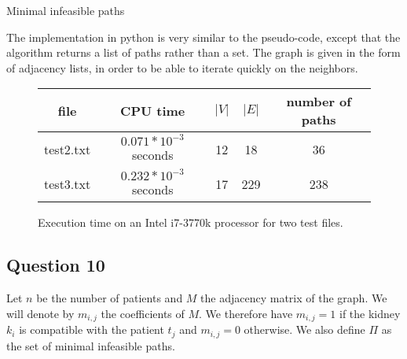 \documentclass[english]{article}
\begin{document}
\begin{algorithm}

    \caption{Minimal infeasible paths}
    


    
  \end{algorithm}

The implementation in python is very similar to the pseudo-code, except that the algorithm returns a list of paths rather than a set. The graph is given in the form of adjacency lists, in order to be able to iterate quickly on the neighbors.

\begin{figure}[ht]
    \centering
    \begin{tabular}{|c|c|c|c|c|}
        \hline
        file & CPU time & $|V|$ & $|E|$ & number of paths \\
        \hline
        test2.txt & $0.071 * 10^{-3}$ seconds & 12 & 18 & 36 \\
        test3.txt & $0.232 * 10^{-3}$ seconds & 17 & 229 & 238 \\
        \hline
    \end{tabular}
    \caption{Execution time on an Intel i7-3770k processor for two test files.}
\end{figure}

\subsection*{Question 10}

Let $n$ be the number of patients and $M$ the adjacency matrix of the graph. We will denote by $ m_ {i, j} $ the coefficients of $M$. We therefore have $m_{i, j} = 1$ if the kidney $k_i$ is compatible with
the patient $t_j$ and $m_{i, j} = 0$ otherwise. We also define $\Pi$ as the set of minimal infeasible paths. 
\end{document}
